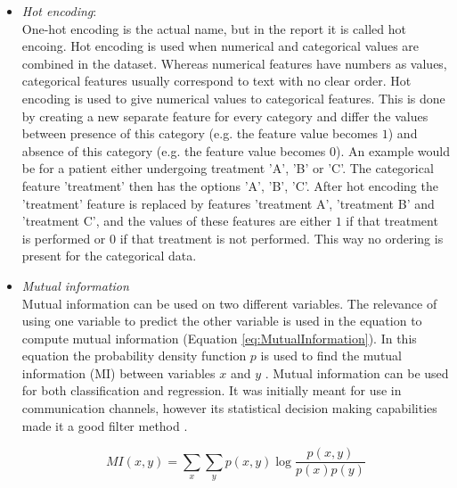 \documentclass[10pt,a4paper]{report}
\begin{document}
\begin{itemize}
\begin{itemize}
		\end{itemize}
		\item \textit{Hot encoding}:\\
		One-hot encoding is the actual name, but in the report it is called hot encoing. Hot encoding is used when numerical and categorical values are combined in the dataset. Whereas numerical features have numbers as values, categorical features usually correspond to text with no clear order. Hot encoding is used to give numerical values to categorical features. This is done by creating a new separate feature for every category and differ the values between presence of this category (e.g. the feature value becomes $1$) and absence of this category (e.g. the feature value becomes $0$). An example would be for a patient either undergoing treatment 'A', 'B' or 'C'. The categorical feature 'treatment' then has the options {'A', 'B', 'C'}. After hot encoding the 'treatment' feature is replaced by features 'treatment A', 'treatment B' and 'treatment C', and the values of these features are either $1$ if that treatment is performed or $0$ if that treatment is not performed. This way no ordering is present for the categorical data.
		\item \textit{Mutual information} \\
		Mutual information can be used on two different variables. The relevance of using one variable to predict the other variable is used in the equation to compute mutual information (Equation \ref{eq:MutualInformation}). In this equation the probability density function $p$ is used to find the mutual information (MI) between variables $x$ and $y$ \cite{peng2005feature}. Mutual information can be used for both classification and regression. It was initially meant for use in communication channels, however its statistical decision making capabilities made it a good filter method \cite{battiti1994using}.
		
		\begin{equation}\label{eq:MutualInformation}
		MI(x, y) = \sum_x \sum_y p(x, y) \log{\frac{p(x, y)}{p(x)p(y)}}
		\end{equation}
		

\end{itemize}
\end{document}
